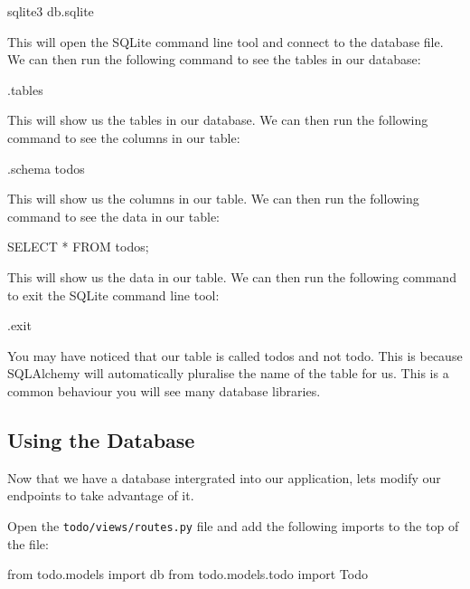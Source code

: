 \documentclass{csse4400}
\begin{document}
\begin{code}[language=bash,numbers=none]{}
  sqlite3 db.sqlite
\end{code}

This will open the SQLite command line tool and connect to the database file. We can then run the following command to see the tables in our database:

\begin{code}[language=sql,numbers=none]{}
  .tables
\end{code}

This will show us the tables in our database. We can then run the following command to see the columns in our table:

\begin{code}[language=sql,numbers=none]{}
  .schema todos
\end{code}

This will show us the columns in our table. We can then run the following command to see the data in our table:

\begin{code}[language=sql,numbers=none]{}
  SELECT * FROM todos;
\end{code}

This will show us the data in our table. We can then run the following command to exit the SQLite command line tool:

\begin{code}[language=sql,numbers=none]{}
  .exit
\end{code}

You may have noticed that our table is called todos and not todo. This is because SQLAlchemy will automatically pluralise the name of the table for us. This is a common behaviour you will see many database libraries.


\subsection{Using the Database}

Now that we have a database intergrated into our application, lets modify our endpoints to take advantage of it. 

Open the \texttt{todo/views/routes.py} file and add the following imports to the top of the file:

\begin{code}[language=python,numbers=none]{}
  from todo.models import db
  from todo.models.todo import Todo
\end{code}
\end{document}
